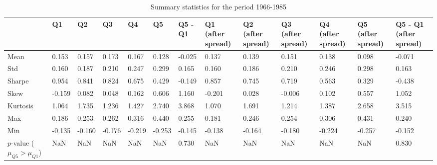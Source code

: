 \begin{table}
\caption{Summary statistics for the period 1966-1985}
\label{tab:summary_1966_1985}
\begin{tabular}{lllllllllllll}
\toprule
 & Q1 & Q2 & Q3 & Q4 & Q5 & Q5 - Q1 & Q1 (after spread) & Q2 (after spread) & Q3 (after spread) & Q4 (after spread) & Q5 (after spread) & Q5 - Q1 (after spread) \\
\midrule
Mean & 0.153 & 0.157 & 0.173 & 0.167 & 0.128 & -0.025 & 0.137 & 0.139 & 0.151 & 0.138 & 0.098 & -0.071 \\
Std & 0.160 & 0.187 & 0.210 & 0.247 & 0.299 & 0.165 & 0.160 & 0.186 & 0.210 & 0.246 & 0.298 & 0.163 \\
Sharpe & 0.954 & 0.841 & 0.824 & 0.675 & 0.429 & -0.149 & 0.857 & 0.745 & 0.719 & 0.563 & 0.329 & -0.438 \\
Skew & -0.159 & 0.082 & 0.048 & 0.162 & 0.606 & 1.160 & -0.201 & 0.028 & -0.006 & 0.102 & 0.557 & 1.052 \\
Kurtosis & 1.064 & 1.735 & 1.236 & 1.427 & 2.740 & 3.868 & 1.070 & 1.691 & 1.214 & 1.387 & 2.658 & 3.515 \\
Max & 0.186 & 0.253 & 0.262 & 0.316 & 0.440 & 0.255 & 0.181 & 0.246 & 0.254 & 0.306 & 0.431 & 0.240 \\
Min & -0.135 & -0.160 & -0.176 & -0.219 & -0.253 & -0.145 & -0.138 & -0.164 & -0.180 & -0.224 & -0.257 & -0.152 \\
$p$-value ($\mu_{Q5} > \mu_{Q1}$) & NaN & NaN & NaN & NaN & NaN & 0.730 & NaN & NaN & NaN & NaN & NaN & 0.830 \\
\bottomrule
\end{tabular}
\end{table}

